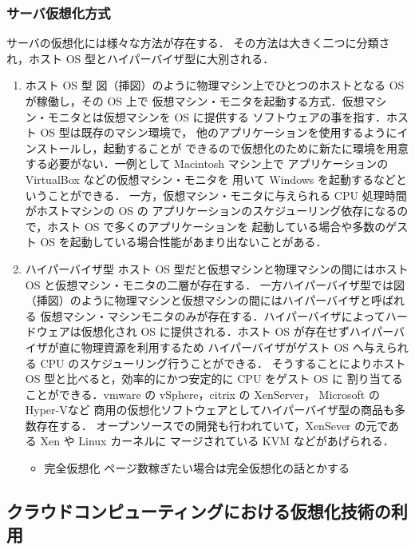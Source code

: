 \documentclass[graduation-thesis]{mlarticle}
\begin{document}
\subsubsection{サーバ仮想化方式}
\label{sec-2-1-3}
サーバの仮想化には様々な方法が存在する．
その方法は大きく二つに分類され，ホスト OS 型とハイパーバイザ型に大別される．
\begin{enumerate}
\item ホスト OS 型
\label{sec-2-1-3-1}
図（挿図）のように物理マシン上でひとつのホストとなる OS が稼働し，その OS 上で
仮想マシン・モニタを起動する方式．仮想マシン・モニタとは仮想マシンを OS に提供する
ソフトウェアの事を指す．ホスト OS 型は既存のマシン環境で，
他のアプリケーションを使用するようにインストールし，起動することが
できるので仮想化のために新たに環境を用意する必要がない．一例として Macintosh マシン上で
アプリケーションの VirtualBox\cite{virtualbox} などの仮想マシン・モニタを
用いて Windows を起動するなどということができる．
一方，仮想マシン・モニタに与えられる CPU 処理時間がホストマシンの OS の
アプリケーションのスケジューリング依存になるので，ホスト OS で多くのアプリケーションを
起動している場合や多数のゲスト OS を起動している場合性能があまり出ないことがある．
\item ハイパーバイザ型
\label{sec-2-1-3-2}
ホスト OS 型だと仮想マシンと物理マシンの間にはホスト OS と仮想マシン・モニタの二層が存在する．
一方ハイパーバイザ型では図（挿図）のように物理マシンと仮想マシンの間にはハイパーバイザと呼ばれる
仮想マシン・マシンモニタのみが存在する．ハイパーバイザによってハードウェアは仮想化され
OS に提供される．ホスト OS が存在せずハイパーバイザが直に物理資源を利用するため
ハイパーバイザがゲスト OS へ与えられる CPU のスケジューリング行うことができる．
そうすることによりホスト OS 型と比べると，効率的にかつ安定的に CPU をゲスト OS に
割り当てることができる．vmware の vSphere\cite{vsphere}，citrix の XenServer\cite{xenserver}，
Microsoft の Hyper-V\cite{hyper-v}など
商用の仮想化ソフトウェアとしてハイパーバイザ型の商品も多数存在する．
オープンソースでの開発も行われていて，XenSever の元である Xen\cite{xen} や Linux カーネルに
マージされている KVM\cite{kvm} などがあげられる．
\begin{itemize}
\item 完全仮想化
ページ数稼ぎたい場合は完全仮想化の話とかする
\end{itemize}
\end{enumerate}
\subsection{クラウドコンピューティングにおける仮想化技術の利用}
\label{sec-2-2}
\end{document}
